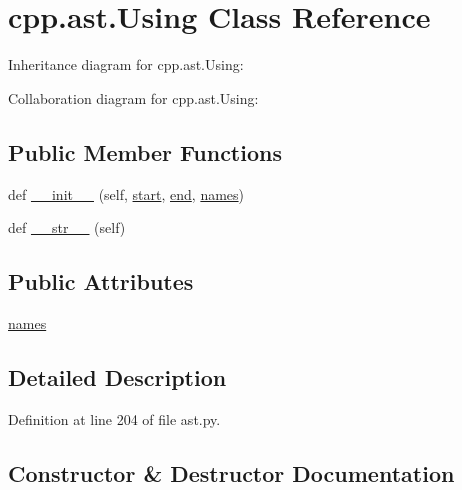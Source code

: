 \hypertarget{classcpp_1_1ast_1_1_using}{}\section{cpp.\+ast.\+Using Class Reference}
\label{classcpp_1_1ast_1_1_using}


Inheritance diagram for cpp.\+ast.\+Using\+:


Collaboration diagram for cpp.\+ast.\+Using\+:
\subsection*{Public Member Functions}
\begin{DoxyCompactItemize}
\item 
def \hyperlink{classcpp_1_1ast_1_1_using_a9b7a760a06d00f7211c889d9841e06af}{\+\_\+\+\_\+init\+\_\+\+\_\+} (self, \hyperlink{classcpp_1_1ast_1_1_node_a7b2aa97e6a049bb1a93aea48c48f1f44}{start}, \hyperlink{classcpp_1_1ast_1_1_node_a3c5e5246ccf619df28eca02e29d69647}{end}, \hyperlink{classcpp_1_1ast_1_1_using_abc05dedb59eb83857d373cc0e64eccb3}{names})
\item 
def \hyperlink{classcpp_1_1ast_1_1_using_ac209e8e5d84988d14a8f4b30377e5455}{\+\_\+\+\_\+str\+\_\+\+\_\+} (self)
\end{DoxyCompactItemize}
\subsection*{Public Attributes}
\begin{DoxyCompactItemize}
\item 
\hyperlink{classcpp_1_1ast_1_1_using_abc05dedb59eb83857d373cc0e64eccb3}{names}
\end{DoxyCompactItemize}


\subsection{Detailed Description}


Definition at line 204 of file ast.\+py.



\subsection{Constructor \& Destructor Documentation}
